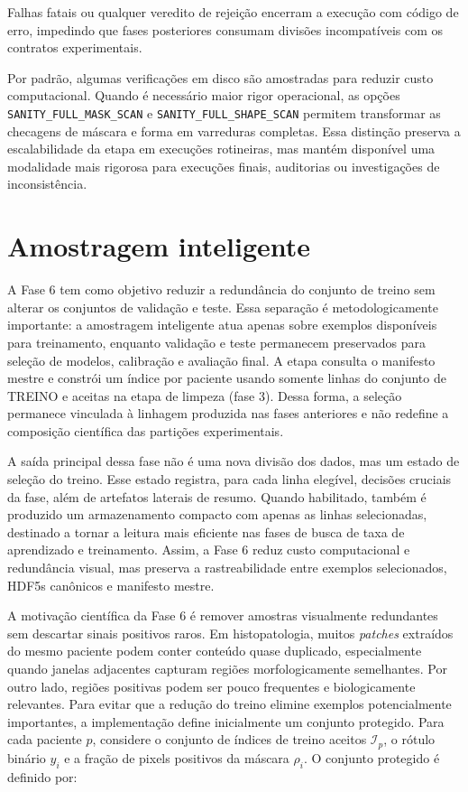 Falhas fatais ou
qualquer veredito de rejeição encerram a execução com código de erro, impedindo
que fases posteriores consumam divisões incompatíveis com os contratos
experimentais.

Por padrão, algumas verificações em disco são amostradas para reduzir custo
computacional. Quando é necessário maior rigor operacional, as opções
\texttt{SANITY\_FULL\_MASK\_SCAN} e \texttt{SANITY\_FULL\_SHAPE\_SCAN}
permitem transformar as checagens de máscara e forma em varreduras completas.
Essa distinção preserva a escalabilidade da etapa em execuções rotineiras, mas
mantém disponível uma modalidade mais rigorosa para execuções finais,
auditorias ou investigações de inconsistência.

\section{Amostragem inteligente}\label{sec:met_amostragem_inteligente}

A Fase 6 tem como objetivo reduzir a redundância do conjunto de treino sem
alterar os conjuntos de validação e teste. Essa separação é metodologicamente
importante: a amostragem inteligente atua apenas sobre exemplos disponíveis para
treinamento, enquanto validação e teste permanecem preservados para seleção de
modelos, calibração e avaliação final. A etapa consulta o
manifesto mestre e constrói um índice por paciente usando
somente linhas do conjunto de TREINO e
aceitas na etapa de limpeza (fase 3). Dessa forma, a seleção permanece vinculada à
linhagem produzida nas fases anteriores e não redefine a composição científica
das partições experimentais.

A saída principal dessa fase não é uma nova divisão dos dados, mas um estado de
seleção do treino. Esse estado registra, para cada linha elegível, decisões cruciais da fase, além de artefatos
laterais de resumo. Quando habilitado, também é produzido um armazenamento
compacto com apenas as linhas selecionadas, destinado a tornar a leitura mais
eficiente nas fases de busca de taxa de aprendizado e treinamento. Assim, a Fase
6 reduz custo computacional e redundância visual, mas preserva a rastreabilidade
entre exemplos selecionados, HDF5s canônicos e manifesto mestre.

A motivação científica da Fase 6 é remover amostras visualmente redundantes sem
descartar sinais positivos raros. Em histopatologia, muitos \textit{patches}
extraídos do mesmo paciente podem conter conteúdo quase duplicado, especialmente
quando janelas adjacentes capturam regiões morfologicamente semelhantes. Por
outro lado, regiões positivas podem ser pouco frequentes e biologicamente
relevantes. Para evitar que a redução do treino elimine exemplos potencialmente
importantes, a implementação define inicialmente um conjunto protegido. Para cada
paciente $p$, considere o conjunto de índices de treino aceitos
$\mathcal{I}_p$, o rótulo binário $y_i$ e a fração de pixels positivos da máscara
$\rho_i$. O conjunto protegido é definido por:

